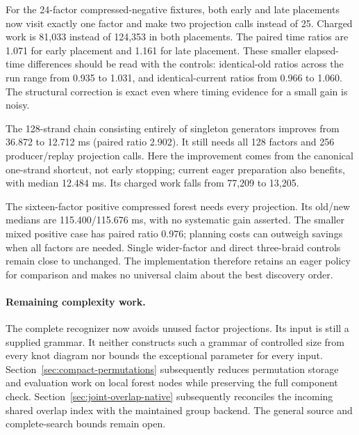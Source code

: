 For the 24-factor compressed-negative fixtures, both early and late
placements now visit exactly one factor and make two projection calls
instead of 25. Charged work is 81,033 instead of 124,353 in both placements.
The paired time ratios are 1.071 for early placement and 1.161 for late
placement. These smaller elapsed-time differences should be read with the
controls: identical-old ratios across the run range from 0.935 to 1.031,
and identical-current ratios from 0.966 to 1.060. The structural correction
is exact even where timing evidence for a small gain is noisy.

The 128-strand chain consisting entirely of singleton generators improves
from 36.872 to 12.712 ms (paired ratio 2.902). It still needs all 128 factors
and 256 producer/replay projection calls. Here the improvement comes from
the canonical one-strand shortcut, not early stopping; current eager
preparation also benefits, with median 12.484 ms. Its charged work falls
from 77,209 to 13,205.

The sixteen-factor positive compressed forest needs every projection.
Its old/new medians are 115.400/115.676 ms, with no systematic gain asserted.
The smaller mixed positive case has paired ratio 0.976; planning costs can
outweigh savings when all factors are needed. Single wider-factor and direct
three-braid controls remain close to unchanged. The implementation therefore
retains an eager policy for comparison and makes no universal claim about
the best discovery order.

\paragraph{Remaining complexity work.}
The complete recognizer now avoids unused factor projections. Its input is
still a supplied grammar. It neither constructs such a
grammar of controlled size from every knot diagram nor bounds the exceptional
parameter for every input. Section~\ref{sec:compact-permutations} subsequently reduces permutation
storage and evaluation work on local forest nodes while preserving the full
component check. Section~\ref{sec:joint-overlap-native} subsequently reconciles the incoming
shared overlap index with the maintained group backend. The general source
and complete-search bounds remain open.

